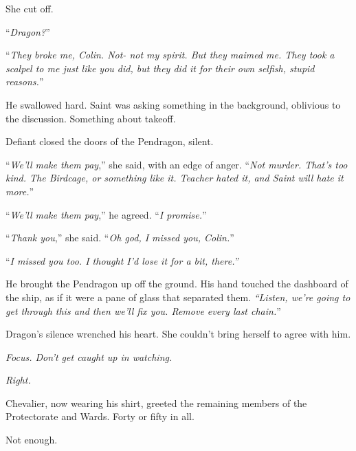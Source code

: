 She cut off.



``\emph{Dragon?}''



``\emph{They broke me, Colin.  Not- not my spirit.  But they maimed me.  They took a scalpel to me just like you did, but they did it for their own selfish, stupid reasons.}''



He swallowed hard.  Saint was asking something in the background, oblivious to the discussion.  Something about takeoff.



Defiant closed the doors of the Pendragon, silent.



``\emph{We'll make them pay},'' she said, with an edge of anger.  ``\emph{Not murder.  That's too kind.  The Birdcage, or something like it.  Teacher hated it, and Saint will hate it more.}''



``\emph{We'll make them pay},'' he agreed.  ``\emph{I promise.}''



``\emph{Thank you},'' she said.  ``\emph{Oh god, I missed you, Colin.}''



``\emph{I missed you too.  I thought I'd lose it for a bit, there.''}



He brought the Pendragon up off the ground.  His hand touched the dashboard of the ship, as if it were a pane of glass that separated them.\emph{  ``Listen, we're going to get through this and then we'll fix you.  Remove every last chain.}''



Dragon's silence wrenched his heart.  She couldn't bring herself to agree with him.



\emph{Focus.  Don't get caught up in watching.}



\emph{Right.}



\blacksquare



Chevalier, now wearing his shirt, greeted the remaining members of the Protectorate and Wards.  Forty or fifty in all.



Not enough.




